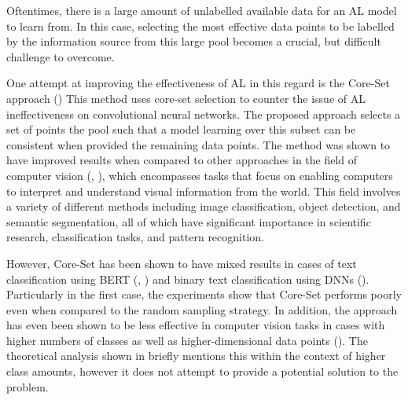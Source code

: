 \documentclass[english,bachelor,ul]{webisthesis} %
\begin{document}
Oftentimes, there is a large amount of unlabelled available data for an AL model to learn from. In this case, selecting the most effective data points to be labelled by the information source from this large pool becomes a crucial, but difficult challenge to overcome. 

One attempt at improving the effectiveness of AL in this regard is the Core-Set approach (\cite{DBLP:conf/iclr/SenerS18}) This method uses core-set selection to counter the issue of AL ineffectiveness on convolutional neural networks. The proposed approach selects a set of points the pool such that a model learning over this subset can be consistent when provided the remaining data points. The method was shown to have improved results when compared to other approaches in the field of computer vision (\cite{DBLP:conf/iclr/SenerS18}, \cite{DBLP:conf/cvpr/CaramalauBK21}), which encompasses tasks that focus on enabling computers to interpret and understand visual information from the world. This field involves a variety of different methods including image classification, object detection, and semantic segmentation, all of which have significant importance in scientific research, classification tasks, and pattern recognition.

However, Core-Set has been shown to have mixed results in cases of text classification using BERT (\cite{DBLP:conf/kdd/0002MM21}, \cite{DBLP:conf/emnlp/Ein-DorHGSDCDAK20}) and binary text classification using DNNs (\cite{DBLP:conf/cikm/Liu0LZW21}). Particularly in the first case, the experiments show that Core-Set performs poorly even when compared to the random sampling strategy. In addition, the approach has even been shown to be less effective in computer vision tasks in cases with higher numbers of classes as well as higher-dimensional data points (\cite{DBLP:conf/iccv/SinhaED19}). The theoretical analysis shown in \cite{DBLP:conf/iclr/SenerS18} briefly mentions this within the context of higher class amounts, however it does not attempt to provide a potential solution to the problem.

\end{document}
